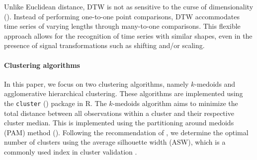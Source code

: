 \documentclass[a4paper,review,12pt,authoryear]{elsarticle}
\begin{document}
Unlike Euclidean distance, DTW is not as sensitive to the curse of dimensionality (\citealp{sakoeDynamicProgrammingAlgorithm1978}). Instead of performing one-to-one point comparisons, DTW accommodates time series of varying lengths through many-to-one comparisons. This flexible approach allows for the recognition of time series with similar shapes, even in the presence of signal transformations such as shifting and/or scaling.


\paragraph{\textbf{Clustering algorithms}}
In this paper, we focus on two clustering algorithms, namely $k$-medoids and agglomerative hierarchical clustering. These algorithms are implemented using the \texttt{cluster} (\citealp{cluster}) package in R. {The $k$-medoids algorithm aims to minimize the total distance between all observations within a cluster and their respective cluster median.} This is implemented using the partitioning around medoids (PAM) method (\citealp{PartitioningMedoidsProgram1990}).
Following the recommendation of \cite{PartitioningMedoidsProgram1990}, we determine the optimal number of clusters using the average silhouette width (ASW), which is a commonly used index in cluster validation \citep[see \textit{e.g.},][]{shutaywi2021silhouette}.
\end{document}
